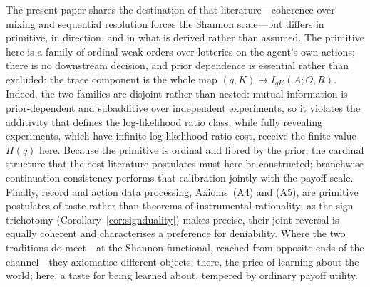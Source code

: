 \documentclass[11pt,a4paper]{article}
\theoremstyle{definition}
\newcommand{\Sh}{H}
\newcommand{\1}{\mathbf 1}
\begin{document}
The present paper shares the destination of that literature---coherence over mixing and sequential resolution forces
the Shannon scale---but differs in primitive, in direction, and in what is derived rather than assumed.  The primitive
here is a family of ordinal weak orders over lotteries on the agent's own actions; there is no downstream decision,
and prior dependence is essential rather than excluded: the trace component is the whole map
$(q,K)\mapsto I_{qK}(A;O,R)$.  Indeed, the two families are disjoint rather than nested: mutual information is
prior-dependent and subadditive over independent experiments, so it violates the additivity that defines the
log-likelihood ratio class, while fully revealing experiments, which have infinite log-likelihood ratio cost, receive
the finite value $\Sh(q)$ here.  Because the primitive is ordinal and fibred by the prior, the cardinal structure that
the cost literature postulates must here be constructed; branchwise continuation consistency performs that
calibration jointly with the payoff scale.  Finally, record and action data processing,
Axioms~\textup{(A4)} and \textup{(A5)}, are primitive postulates of taste rather than theorems of instrumental
rationality; as the sign trichotomy (Corollary~\ref{cor:signduality}) makes precise, their joint reversal is equally
coherent and characterises a preference for deniability.  Where the two traditions do meet---at the Shannon
functional, reached from opposite ends of the channel---they axiomatise different objects: there, the price of learning
about the world; here, a taste for being learned about, tempered by ordinary payoff utility.
\end{document}
